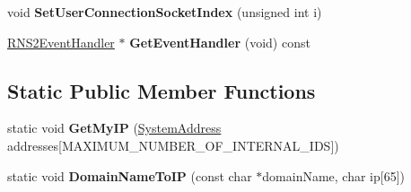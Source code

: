 \begin{DoxyCompactItemize}
\item 
\hypertarget{class_rak_net_1_1_rak_net_socket2_a2f37259c02514b94afa10da8176e4927}{void {\bfseries Set\-User\-Connection\-Socket\-Index} (unsigned int i)}\label{class_rak_net_1_1_rak_net_socket2_a2f37259c02514b94afa10da8176e4927}

\item 
\hypertarget{class_rak_net_1_1_rak_net_socket2_a8459ead3752ad9786f638bbf6f561658}{\hyperlink{class_rak_net_1_1_r_n_s2_event_handler}{R\-N\-S2\-Event\-Handler} $\ast$ {\bfseries Get\-Event\-Handler} (void) const }\label{class_rak_net_1_1_rak_net_socket2_a8459ead3752ad9786f638bbf6f561658}

\end{DoxyCompactItemize}
\subsection*{Static Public Member Functions}
\begin{DoxyCompactItemize}
\item 
\hypertarget{class_rak_net_1_1_rak_net_socket2_a0e2792f02673e29236ed3a4a19ca3127}{static void {\bfseries Get\-My\-I\-P} (\hyperlink{struct_rak_net_1_1_system_address}{System\-Address} addresses\mbox{[}M\-A\-X\-I\-M\-U\-M\-\_\-\-N\-U\-M\-B\-E\-R\-\_\-\-O\-F\-\_\-\-I\-N\-T\-E\-R\-N\-A\-L\-\_\-\-I\-D\-S\mbox{]})}\label{class_rak_net_1_1_rak_net_socket2_a0e2792f02673e29236ed3a4a19ca3127}

\item 
\hypertarget{class_rak_net_1_1_rak_net_socket2_a1c987c3b4d8d7959798b6bb2f92649f6}{static void {\bfseries Domain\-Name\-To\-I\-P} (const char $\ast$domain\-Name, char ip\mbox{[}65\mbox{]})}\label{class_rak_net_1_1_rak_net_socket2_a1c987c3b4d8d7959798b6bb2f92649f6}

\end{DoxyCompactItemize}
